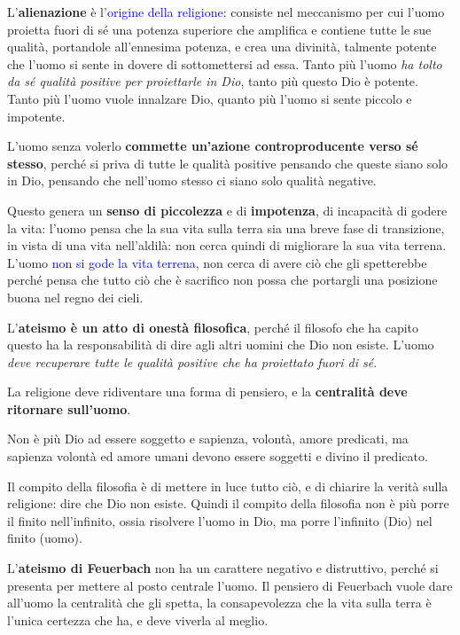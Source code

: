 \documentclass[a4paper, twoside, titlepage]{book}
\renewcommand{\emph}[1]{\textcolor{blue}{#1}}
\begin{document}
L'\textbf{alienazione} è l'\emph{origine della religione}: consiste nel meccanismo per cui l'uomo proietta fuori di sé una potenza superiore che amplifica e contiene tutte le sue qualità, portandole all'ennesima potenza, e crea una divinità, talmente potente che l'uomo si sente in dovere di sottomettersi ad essa.
Tanto più l'uomo \textit{ha tolto da sé qualità positive per proiettarle in Dio}, tanto più questo Dio è potente. Tanto più l'uomo vuole innalzare Dio, quanto più l'uomo si sente piccolo e impotente.

L'uomo senza volerlo \textbf{commette un'azione controproducente verso sé stesso}, perché si priva di tutte le qualità positive pensando che queste siano solo in Dio, pensando che nell'uomo stesso ci siano solo qualità negative.

Questo genera un \textbf{senso di piccolezza} e di \textbf{impotenza}, di incapacità di godere la vita: l'uomo pensa che la sua vita sulla terra sia una breve fase di transizione, in vista di una vita nell'aldilà: non cerca quindi di migliorare la sua vita terrena.
L'uomo \emph{non si gode la vita terrena}, non cerca di avere ciò che gli spetterebbe perché pensa che tutto ciò che è sacrifico non possa che portargli una posizione buona nel regno dei cieli.

L'\textbf{ateismo è un atto di onestà filosofica}, perché il filosofo che ha capito questo ha la responsabilità di dire agli altri uomini che Dio non esiste.
L'uomo \textit{deve recuperare tutte le qualità positive che ha proiettato fuori di sé}.

La religione deve ridiventare una forma di pensiero, e la \textbf{centralità deve ritornare sull'uomo}.

Non è più Dio ad essere soggetto​ e sapienza, volontà, amore predicati,​ ma​ sapienza volontà ed amore umani devono essere soggetti​ e divino il predicato.​

Il compito della filosofia è di mettere in luce tutto ciò, e di chiarire la verità sulla religione: dire che Dio non esiste.
Quindi il compito della filosofia non è più porre il finito nell’infinito,​ ossia risolvere l’uomo in Dio,​ ma porre l’infinito (Dio) nel finito (uomo).​

L'\textbf{ateismo di Feuerbach} non ha un carattere negativo e distruttivo, perché si presenta per mettere al posto centrale l'uomo.
Il pensiero di Feuerbach vuole dare all'uomo la centralità che gli spetta, la consapevolezza che la vita sulla terra è l'unica certezza che ha, e deve viverla al meglio.
\end{document}

